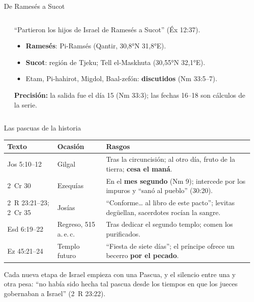 \documentclass[hyperref={bookmarks=false},aspectratio=169]{beamer}
\newcommand{\destacar}[1]{\textbf{\textcolor{tierraroja}{#1}}}
\newcommand{\precision}[1]{{\footnotesize\color{sepia}\textbf{Precisión:} #1}}
\begin{document}
\begin{frame}{De Ramesés a Sucot}
\begin{columns}[c,onlytextwidth]
\begin{column}{0.56\textwidth}
\end{column}
\begin{column}{0.42\textwidth}\small\RaggedRight
``Partieron los hijos de Israel de Ramesés a Sucot'' (Éx 12:37).
\begin{itemize}\small
\item \destacar{Ramesés}: Pi-Ramsés (Qantir, 30,8°N 31,8°E).
\item \destacar{Sucot}: región de Tjeku; Tell el-Maskhuta (30,55°N 32,1°E).
\item Etam, Pi-hahirot, Migdol, Baal-zefón: \destacar{discutidos} (Nm 33:5--7).
\end{itemize}
\precision{la salida fue el día 15 (Nm 33:3); las fechas 16--18 son cálculos de la serie.}
\end{column}
\end{columns}
\end{frame}

\begin{frame}{Las pascuas de la historia}
\scriptsize\renewcommand{\arraystretch}{1.15}
\begin{tabular}{@{}L{2.4cm}L{2.2cm}L{7.5cm}@{}}
\toprule
\textbf{Texto} & \textbf{Ocasión} & \textbf{Rasgos} \\ \midrule
Jos 5:10--12 & Gilgal & Tras la circuncisión; al otro día, fruto de la tierra; \destacar{cesa el maná}. \\
2~Cr 30 & Ezequías & En el \destacar{mes segundo} (Nm 9); intercede por los impuros y ``sanó al pueblo'' (30:20). \\
2~R 23:21--23; 2~Cr 35 & Josías & ``Conforme\ldots{} al libro de este pacto''; levitas degüellan, sacerdotes rocían la sangre. \\
Esd 6:19--22 & Regreso, 515 a.\,e.\,c. & Tras dedicar el segundo templo; comen los purificados. \\
Ez 45:21--24 & Templo futuro & ``Fiesta de siete días''; el príncipe ofrece un becerro \destacar{por el pecado}. \\
\bottomrule
\end{tabular}\par\medskip
\small\RaggedRight Cada nueva etapa de Israel empieza con una Pascua, y el silencio entre una y otra pesa: ``no había sido hecha tal pascua desde los tiempos en que los jueces gobernaban a Israel'' (2~R 23:22).
\end{frame}
\end{document}
